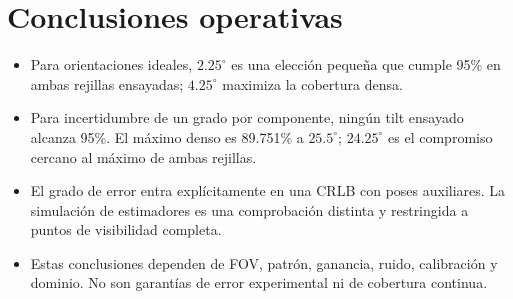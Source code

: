 \documentclass[11pt,a4paper]{article}
\begin{document}
\section{Conclusiones operativas}
\begin{itemize}
\item Para orientaciones ideales, $2.25^\circ$ es una elección pequeña que cumple 95\% en ambas rejillas ensayadas; $4.25^\circ$ maximiza la cobertura densa.
\item Para incertidumbre de un grado por componente, ningún tilt ensayado alcanza 95\%. El máximo denso es 89.751\% a $25.5^\circ$; $24.25^\circ$ es el compromiso cercano al máximo de ambas rejillas.
\item El grado de error entra explícitamente en una CRLB con poses auxiliares. La simulación de estimadores es una comprobación distinta y restringida a puntos de visibilidad completa.
\item Estas conclusiones dependen de FOV, patrón, ganancia, ruido, calibración y dominio. No son garantías de error experimental ni de cobertura continua.
\end{itemize}
\end{document}
